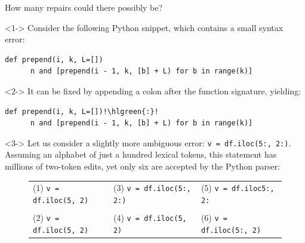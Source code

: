 \documentclass{beamer}
\begin{document}
\begin{frame}[t,fragile]{How many repairs could there possibly be?}
  \begin{onlyenv}<1->
  Consider the following Python snippet, which contains a small syntax error:\\

  \begin{lstlisting}[escapechar=!, basicstyle=\linespread{1.3}\ttfamily\footnotesize]
    def prepend(i, k, L=[])
      n and [prepend(i - 1, k, [b] + L) for b in range(k)]
  \end{lstlisting}
  \end{onlyenv}

  \begin{onlyenv}<2->
  It can be fixed by appending a colon after the function signature, yielding:\\

  \begin{lstlisting}[escapechar=!, basicstyle=\linespread{1.3}\ttfamily\footnotesize]
    def prepend(i, k, L=[])!\hlgreen{:}!
      n and [prepend(i - 1, k, [b] + L) for b in range(k)]
  \end{lstlisting}
  \vspace{0.3cm}
  \end{onlyenv}
  \begin{onlyenv}<3->
  \normalsize Let us consider a slightly more ambiguous error: \footnotesize{\texttt{v = df.iloc(5:, 2:)}}. \normalsize Assuming an alphabet of just a hundred lexical tokens, this statement has millions of two-token edits, yet only six are accepted by the Python parser:

    \scriptsize
    \begin{figure}[h!]
      \noindent\begin{tabular}{@{}l@{\hspace{10pt}}l@{\hspace{10pt}}l@{}}
      (1) \texttt{v = df.iloc(5\hlred{:}, 2\hlorange{,})} & (3) \texttt{v = df.iloc(5\hlgreen{[}:, 2:\hlgreen{]})} & (5) \texttt{v = df.iloc\hlorange{[}5:, 2:\hlorange{]}} \\\\
      (2) \texttt{v = df.iloc(5\hlorange{)}, 2\hlorange{(})} & (4) \texttt{v = df.iloc(5\hlred{:}, 2\hlred{:})} & (6) \texttt{v = df.iloc(5\hlgreen{[}:, 2\hlorange{]})} \\
      \end{tabular}
    \end{figure}
  \end{onlyenv}
\end{frame}
\end{document}
